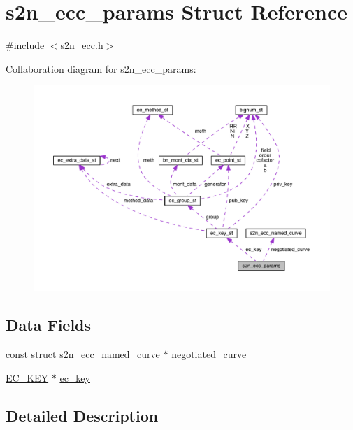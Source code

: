 \hypertarget{structs2n__ecc__params}{}\section{s2n\+\_\+ecc\+\_\+params Struct Reference}
\label{structs2n__ecc__params}


{\ttfamily \#include $<$s2n\+\_\+ecc.\+h$>$}



Collaboration diagram for s2n\+\_\+ecc\+\_\+params\+:\nopagebreak
\begin{figure}[H]
\begin{center}
\leavevmode
\includegraphics[width=350pt]{structs2n__ecc__params__coll__graph}
\end{center}
\end{figure}
\subsection*{Data Fields}
\begin{DoxyCompactItemize}
\item 
const struct \hyperlink{structs2n__ecc__named__curve}{s2n\+\_\+ecc\+\_\+named\+\_\+curve} $\ast$ \hyperlink{structs2n__ecc__params_a1e0c49e3a87b8db6332443fcf0462468}{negotiated\+\_\+curve}
\item 
\hyperlink{crypto_2ec_2ec_8h_a756878ae60b2fc17d4217e77ffe5e0d3}{E\+C\+\_\+\+K\+EY} $\ast$ \hyperlink{structs2n__ecc__params_a507c1731500e509e84bc42991cb6aea6}{ec\+\_\+key}
\end{DoxyCompactItemize}


\subsection{Detailed Description}


